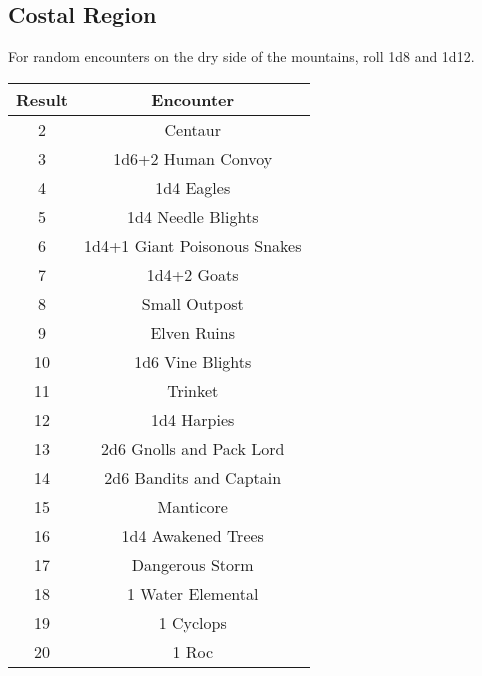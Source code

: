 \subsection{Costal Region}

For random encounters on the dry side of the mountains, roll 1d8 and 1d12.

\begin{tabular}{|c|c|}

\hline

\textbf{Result} & \textbf{Encounter}\\

\hline

2 & Centaur\\

3 & 1d6+2 Human Convoy\\

4 & 1d4 Eagles\\

5 & 1d4 Needle Blights\\

6 & 1d4+1 Giant Poisonous Snakes\\

7 & 1d4+2 Goats\\

8 & Small Outpost\\

9 & Elven Ruins\\

10 & 1d6 Vine Blights\\

11 & Trinket\\

12 & 1d4 Harpies\\

13 & 2d6 Gnolls and Pack Lord\\

14 & 2d6 Bandits and Captain\\

15 & Manticore\\

16 & 1d4 Awakened Trees\\

17 & Dangerous Storm\\

18 & 1 Water Elemental\\

19 & 1 Cyclops\\

20 & 1 Roc\\

\hline

\end{tabular}
